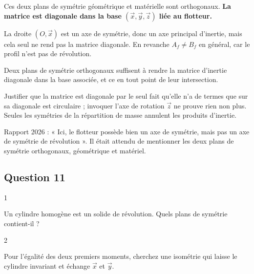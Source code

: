 \documentclass[11pt,a4paper]{article}
\begin{document}
Ces deux plans de symétrie géométrique et matérielle sont orthogonaux. \textbf{La matrice est diagonale dans la base \((\vec x,\vec y,\vec z)\) liée au flotteur.}

La droite \((O,\vec x)\) est un axe de symétrie, donc un axe principal d'inertie, mais cela seul ne rend pas la matrice diagonale. En revanche \(A_f\neq B_f\) en général, car le profil n'est pas de révolution.

\begin{methode}

Deux plans de symétrie orthogonaux suffisent à rendre la matrice d'inertie diagonale dans la base associée, et ce en tout point de leur intersection.

\end{methode}

\begin{piege}

Justifier que la matrice est diagonale par le seul fait qu'elle n'a de termes que sur sa diagonale est circulaire ; invoquer l'axe de rotation \(\vec z\) ne prouve rien non plus. Seules les symétries de la répartition de masse annulent les produits d'inertie.

\end{piege}

\begin{jury}

Rapport 2026 : « Ici, le flotteur possède bien un axe de symétrie, mais pas un axe de symétrie de révolution ». Il était attendu de mentionner les deux plans de symétrie orthogonaux, géométrique et matériel.

\end{jury}

\hypertarget{question-11}{%
\subsection{Question 11}\label{question-11}}

\begin{indication}{1}

Un cylindre homogène est un solide de révolution. Quels plans de symétrie contient-il ?

\end{indication}

\begin{indication}{2}

Pour l'égalité des deux premiers moments, cherchez une isométrie qui laisse le cylindre invariant et échange \(\vec x\) et \(\vec y\).

\end{indication}
\end{document}
